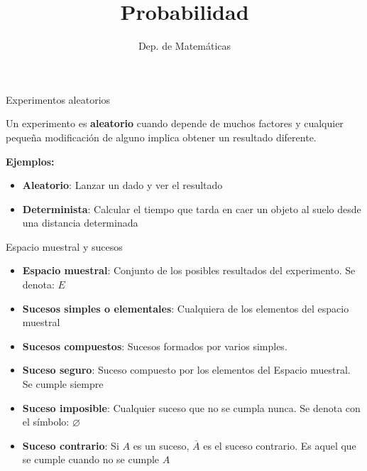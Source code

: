\documentclass[11pt,handout]{beamer}
\title{Probabilidad}
\date{}
\author{Dep. de Matemáticas}
\begin{document}
\begin{frame}
\titlepage
\end{frame}


\begin{frame}{Experimentos aleatorios}
\begin{block}{}
Un experimento es \textbf{aleatorio} cuando depende de muchos factores y cualquier pequeña modificación de alguno implica obtener un resultado diferente.
\end{block}
\pause
\textbf{Ejemplos:}
\begin{itemize}[<+->]
 \item \textbf{Aleatorio}: Lanzar un dado y ver el resultado
 \item \textbf{Determinista}: Calcular el tiempo que tarda en caer un objeto al suelo desde una distancia determinada
 \end{itemize} 

\end{frame}



\begin{frame}{Espacio muestral y sucesos}
\begin{itemize}[<+->]
\item \textbf{Espacio muestral}: Conjunto de los posibles resultados del experimento. Se denota: $E$
\item \textbf{Sucesos simples o elementales}: Cualquiera de los elementos del espacio muestral
\item \textbf{Sucesos compuestos}: Sucesos formados por varios simples. 
\item \textbf{Suceso seguro}: Suceso compuesto por los elementos del Espacio muestral. Se cumple siempre
\item \textbf{Suceso imposible}: Cualquier suceso que no se cumpla nunca. Se denota con el símbolo: $\varnothing$
\item \textbf{Suceso contrario}: Si $A$ es un suceso, $\overline{A}$ es el suceso contrario. Es aquel que se cumple cuando no se cumple $A$
\end{itemize}

\end{frame}
\end{document}
